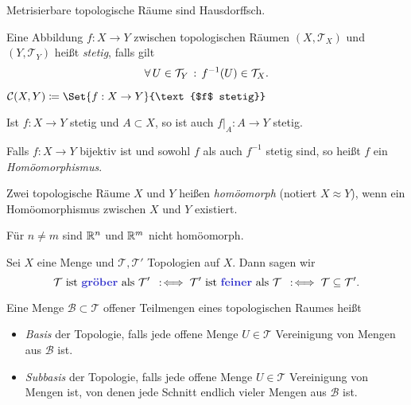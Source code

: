 \documentclass{cheat-sheet}
\newcommand{\Tau}{\mathcal{T}} %
\begin{document}
\begin{prop}
  Metrisierbare topologische Räume sind Hausdorffsch.
\end{prop}

\begin{defn}
  Eine Abbildung $f : X \to Y$ zwischen topologischen Räumen $(X, \Tau_X)$ und $(Y, \Tau_Y)$ heißt \emph{stetig}, falls gilt
  \[ \fa{U \in \Tau_Y} f^{-1}(U) \in \Tau_X. \]
\end{defn}

\begin{nota}
  $\mathcal{C}(X, Y) \coloneqq \Set{ f : X \to Y }{\text{$f$ stetig}}$
\end{nota}

\begin{bem}
  Ist $f : X \to Y$ stetig und $A \subset X$, so ist auch $f|_A : A \to Y$ stetig.
\end{bem}

\begin{defn}
  Falls $f : X \to Y$ bijektiv ist und sowohl $f$ als auch $f^{-1}$ stetig sind, so heißt $f$ ein \emph{Homöomorphismus}.
\end{defn}

\begin{defn}
  Zwei topologische Räume $X$ und $Y$ heißen \emph{homöomorph} (notiert $X \approx Y$), wenn ein Homöomorphismus zwischen $X$ und $Y$ existiert.
\end{defn}

\begin{satz}
  Für $n \not= m$ sind $\mathbb{R}^n$ und $\mathbb{R}^m$ nicht homöomorph.
\end{satz}

\begin{defn}
  Sei $X$ eine Menge und $\Tau, \Tau'$ Topologien auf $X$. Dann sagen wir
  \[ \Tau \text{ ist \emph{gröber} als } \Tau' \coloniff \Tau' \text{ ist \emph{feiner} als } \Tau \coloniff \Tau \subseteq \Tau'. \]
\end{defn}


\begin{defn}
  Eine Menge $\mathcal{B} \subset \Tau$ offener Teilmengen eines topologischen Raumes heißt
  \begin{itemize}
    \item \emph{Basis} der Topologie, falls jede offene Menge $U \in \Tau$ Vereinigung von Mengen aus $\mathcal{B}$ ist.
    \item \emph{Subbasis} der Topologie, falls jede offene Menge $U \in \Tau$ Vereinigung von Mengen ist, von denen jede Schnitt endlich vieler Mengen aus $\mathcal{B}$ ist.
  \end{itemize}
\end{defn}
\end{document}
